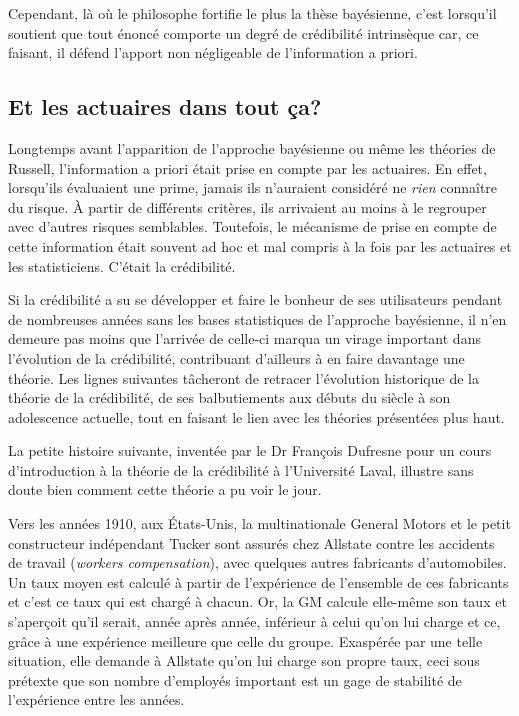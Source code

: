 Cependant, là où le philosophe fortifie le plus la thèse bayésienne,
c'est lorsqu'il soutient que tout énoncé comporte un degré de
crédibilité intrinsèque car, ce faisant, il défend l'apport non
négligeable de l'information a priori.

\subsection{Et les actuaires dans tout ça?}

Longtemps avant l'apparition de l'approche bayésienne ou même les
théories de Russell, l'information a priori était prise en compte par
les actuaires. En effet, lorsqu'ils évaluaient une prime, jamais ils
n'auraient considéré ne \emph{rien} connaître du risque. À partir de
différents critères, ils arrivaient au moins à le regrouper avec
d'autres risques semblables. Toutefois, le mécanisme de prise en
compte de cette information était souvent ad hoc et mal compris à
la fois par les actuaires et les statisticiens. C'était la
crédibilité.

Si la crédibilité a su se développer et faire le bonheur de ses
utilisateurs pendant de nombreuses années sans les bases statistiques
de l'approche bayésienne, il n'en demeure pas moins que l'arrivée de
celle-ci marqua un virage important dans l'évolution de la
crédibilité, contribuant d'ailleurs à en faire davantage une théorie.
Les lignes suivantes tâcheront de retracer l'évolution historique de
la théorie de la crédibilité, de ses balbutiements aux débuts du
siècle à son adolescence actuelle, tout en faisant le lien avec les
théories présentées plus haut.

La petite histoire suivante, inventée par le Dr François Dufresne pour
un cours d'introduction à la théorie de la crédibilité à l'Université
Laval, illustre sans doute bien comment cette théorie a pu voir le
jour.

Vers les années 1910, aux États-Unis, la multinationale General Motors
et le petit constructeur indépendant Tucker sont assurés chez Allstate
contre les accidents de travail (\emph{workers compensation}), avec
quelques autres fabricants d'automobiles. Un taux moyen est calculé à
partir de l'expérience de l'ensemble de ces fabricants et c'est ce
taux qui est chargé à chacun. Or, la GM calcule elle-même son taux et
s'aperçoit qu'il serait, année après année, inférieur à celui qu'on
lui charge et ce, grâce à une expérience meilleure que celle du
groupe. Exaspérée par une telle situation, elle demande à Allstate
qu'on lui charge son propre taux, ceci sous prétexte que son nombre
d'employés important est un gage de stabilité de l'expérience entre
les années.

